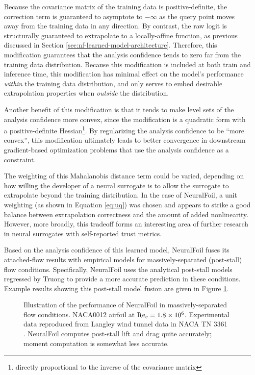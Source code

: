 Because the covariance matrix of the training data is positive-definite, the correction term is guaranteed to asymptote to $-\infty$ as the query point moves away from the training data in any direction. By contrast, the raw logit is structurally guaranteed to extrapolate to a locally-affine function, as previous discussed in Section \ref{sec:nf-learned-model-architecture}. Therefore, this modification guarantees that the analysis confidence tends to zero far from the training data distribution. Because this modification is included at both train and inference time, this modification has minimal effect on the model's performance \textit{within} the training data distribution, and only serves to embed desirable extrapolation properties when \textit{outside} the distribution.

Another benefit of this modification is that it tends to make level sets of the analysis confidence more convex, since the modification is a quadratic form with a positive-definite Hessian\footnote{directly proportional to the inverse of the covariance matrix}. By regularizing the analysis confidence to be ``more convex'', this modification ultimately leads to better convergence in downstream gradient-based optimization problems that use the analysis confidence as a constraint.

The weighting of this Mahalanobis distance term could be varied, depending on how willing the developer of a neural surrogate is to allow the surrogate to extrapolate beyond the training distribution. In the case of NeuralFoil, a unit weighting (as shown in Equation \ref{eq:uq}) was chosen and appears to strike a good balance between extrapolation correctness and the amount of added nonlinearity. However, more broadly, this tradeoff forms an interesting area of further research in neural surrogates with self-reported trust metrics.

Based on the analysis confidence of this learned model, NeuralFoil fuses its attached-flow results with empirical models for massively-separated (post-stall) flow conditions. Specifically, NeuralFoil uses the analytical post-stall models regressed by Truong \cite{truong_analytical_2020} to provide a more accurate prediction in these conditions. Example results showing this post-stall model fusion are given in Figure \ref{fig:post_stall_extrapolation}.

\begin{figure}[H]
    \centering
    
    \caption{Illustration of the performance of NeuralFoil in massively-separated flow conditions. NACA0012 airfoil at $\rm Re_c=1.8\times 10^6$. Experimental data reproduced from Langley wind tunnel data in NACA TN 3361 \cite{critzos_aerodynamic_1955}. NeuralFoil computes post-stall lift and drag quite accurately; moment computation is somewhat less accurate.}
    \label{fig:post_stall_extrapolation}
\end{figure}

